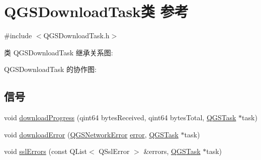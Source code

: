 \hypertarget{class_q_g_s_download_task}{}\section{Q\+G\+S\+Download\+Task类 参考}
\label{class_q_g_s_download_task}


{\ttfamily \#include $<$Q\+G\+S\+Download\+Task.\+h$>$}



类 Q\+G\+S\+Download\+Task 继承关系图\+:


Q\+G\+S\+Download\+Task 的协作图\+:
\subsection*{信号}
\begin{DoxyCompactItemize}
\item 
void \mbox{\hyperlink{class_q_g_s_download_task_a0de831509879a0dd2b1780305a3f2bf3}{download\+Progress}} (qint64 bytes\+Received, qint64 bytes\+Total, \mbox{\hyperlink{class_q_g_s_task}{Q\+G\+S\+Task}} $\ast$task)
\item 
void \mbox{\hyperlink{class_q_g_s_download_task_ab01c215f547152f0b419e9e1d92e7488}{download\+Error}} (\mbox{\hyperlink{class_q_g_s_network_error}{Q\+G\+S\+Network\+Error}} \mbox{\hyperlink{class_q_g_s_task_a0ac4592b48e8de87af4f92c4a98a1763}{error}}, \mbox{\hyperlink{class_q_g_s_task}{Q\+G\+S\+Task}} $\ast$task)
\item 
void \mbox{\hyperlink{class_q_g_s_download_task_a3851d55e8d53389d620bd93d4bc4e8ea}{ssl\+Errors}} (const Q\+List$<$ Q\+Ssl\+Error $>$ \&errors, \mbox{\hyperlink{class_q_g_s_task}{Q\+G\+S\+Task}} $\ast$task)
\end{DoxyCompactItemize}
